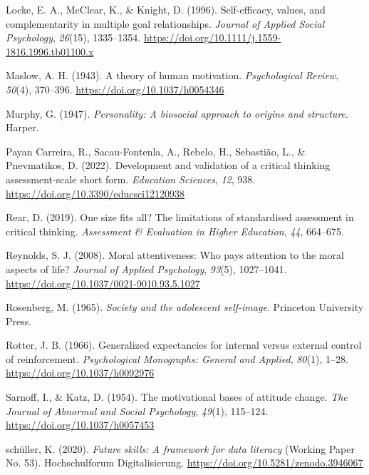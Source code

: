 \documentclass[
  12pt,
  a4paper,
  twoside]{article}
\newlength{\cslhangindent}
\newlength{\cslentryspacingunit} %
\newenvironment{CSLReferences}[2] %
 {%
  \setlength{\parindent}{0pt}
  \ifodd #1
  \let\oldpar\par
  \def\par{\hangindent=\cslhangindent\oldpar}
  \fi
  \setlength{\parskip}{#2\cslentryspacingunit}
 }%
 {}
\begin{document}
\begin{CSLReferences}{1}{0}
\leavevmode{}%
Locke, E. A., McClear, K., \& Knight, D. (1996). Self-efficacy, values, and complementarity in multiple goal relationships. \emph{Journal of Applied Social Psychology}, \emph{26}(15), 1335--1354. \url{https://doi.org/10.1111/j.1559-1816.1996.tb01100.x}

\leavevmode{}%
Maslow, A. H. (1943). A theory of human motivation. \emph{Psychological Review}, \emph{50}(4), 370--396. \url{https://doi.org/10.1037/h0054346}

\leavevmode{}%
Murphy, G. (1947). \emph{Personality: A biosocial approach to origins and structure}. Harper.

\leavevmode{}%
Payan Carreira, R., Sacau-Fontenla, A., Rebelo, H., Sebastião, L., \& Pnevmatikos, D. (2022). Development and validation of a critical thinking assessment-scale short form. \emph{Education Sciences}, \emph{12}, 938. \url{https://doi.org/10.3390/educsci12120938}

\leavevmode{}%
Rear, D. (2019). One size fits all? The limitations of standardised assessment in critical thinking. \emph{Assessment \& Evaluation in Higher Education}, \emph{44}, 664--675.

\leavevmode{}%
Reynolds, S. J. (2008). Moral attentiveness: Who pays attention to the moral aspects of life? \emph{Journal of Applied Psychology}, \emph{93}(5), 1027--1041. \url{https://doi.org/10.1037/0021-9010.93.5.1027}

\leavevmode{}%
Rosenberg, M. (1965). \emph{Society and the adolescent self-image}. Princeton University Press.

\leavevmode{}%
Rotter, J. B. (1966). Generalized expectancies for internal versus external control of reinforcement. \emph{Psychological Monographs: General and Applied}, \emph{80}(1), 1--28. \url{https://doi.org/10.1037/h0092976}

\leavevmode{}%
Sarnoff, I., \& Katz, D. (1954). The motivational bases of attitude change. \emph{The Journal of Abnormal and Social Psychology}, \emph{49}(1), 115--124. \url{https://doi.org/10.1037/h0057453}

\leavevmode{}%
schüller, K. (2020). \emph{Future skills: A framework for data literacy} (Working Paper No. 53). Hochschulforum Digitalisierung. \url{https://doi.org/10.5281/zenodo.3946067}


\end{CSLReferences}
\end{document}

